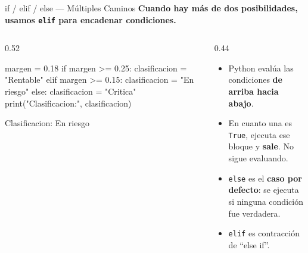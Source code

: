 \documentclass[aspectratio=169, 11pt]{beamer}
\begin{document}
\begin{frame}[fragile,shrink=30]{if / elif / else — Múltiples Caminos}
  \vspace{-6pt}
  {\small\color{arcaDark}\bfseries
    Cuando hay más de dos posibilidades, usamos \texttt{elif}
    para encadenar condiciones.}

  \vspace{4pt}
  \begin{columns}[T]
    \begin{column}{0.52\textwidth}
      \begin{pyblock}
margen = 0.18
if margen >= 0.25:
    clasificacion = "Rentable"
elif margen >= 0.15:
    clasificacion = "En riesgo"
else:
    clasificacion = "Critica"
print("Clasificacion:", clasificacion)
      \end{pyblock}
      \vspace{-2pt}
      \begin{outputblock}
Clasificacion: En riesgo
      \end{outputblock}
    \end{column}

    \begin{column}{0.44\textwidth}
      {\scriptsize\color{textMuted}
      \begin{itemize}\setlength{\itemsep}{5pt}
        \item[{\color{arcaRed}\scriptsize\faArrowRight}]
          Python evalúa las condiciones
          \textbf{de arriba hacia abajo}.
        \item[{\color{arcaRed}\scriptsize\faArrowRight}]
          En cuanto una es \texttt{True},
          ejecuta ese bloque y \textbf{sale}.
          No sigue evaluando.
        \item[{\color{arcaRed}\scriptsize\faArrowRight}]
          \texttt{else} es el \textbf{caso por defecto}:
          se ejecuta si ninguna condición
          fue verdadera.
        \item[{\color{arcaRed}\scriptsize\faArrowRight}]
          \texttt{elif} es contracción de
          ``else if''.
      \end{itemize}
      }
    \end{column}
  \end{columns}
\end{frame}
\end{document}
